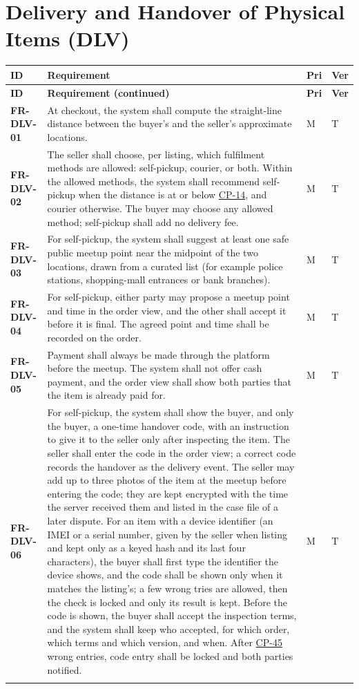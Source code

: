\documentclass[11pt,a4paper]{report}
\makeatletter
\newenvironment{reqs}{%
  \small
  \begin{longtable}{@{}>{\raggedright\arraybackslash}p{2.35cm}
                       >{\raggedright\arraybackslash}p{10.3cm}
                       >{\centering\arraybackslash}p{0.7cm}
                       >{\centering\arraybackslash}p{0.7cm}@{}}
  \toprule
  \textbf{ID} & \textbf{Requirement} & \textbf{Pri} & \textbf{Ver} \\
  \midrule
  \endfirsthead
  \toprule
  \textbf{ID} & \textbf{Requirement (continued)} & \textbf{Pri} & \textbf{Ver} \\
  \midrule
  \endhead
  \bottomrule
  \endfoot
}{\end{longtable}}
\newcommand{\req}[5]{\leavevmode\textbf{#1}\hypertarget{#1}{} & #5 & #2 & #3 \\ \addlinespace[2pt]}
\newcommand{\cp}[1]{\hyperlink{#1}{#1}}
\makeatother
\begin{document}
\section{Delivery and Handover of Physical Items (DLV)}
\label{sec:fr-dlv}
\begin{reqs}
\req{FR-DLV-01}{M}{T}{FR-50}{At checkout, the system shall compute the straight-line distance between the buyer's and the seller's approximate locations.}
\req{FR-DLV-02}{M}{T}{FR-51}{The seller shall choose, per listing, which fulfilment methods are allowed: self-pickup, courier, or both. Within the allowed methods, the system shall recommend self-pickup when the distance is at or below \cp{CP-14}, and courier otherwise. The buyer may choose any allowed method; self-pickup shall add no delivery fee.}
\req{FR-DLV-03}{M}{T}{FR-52}{For self-pickup, the system shall suggest at least one safe public meetup point near the midpoint of the two locations, drawn from a curated list (for example police stations, shopping-mall entrances or bank branches).}
\req{FR-DLV-04}{M}{T}{new}{For self-pickup, either party may propose a meetup point and time in the order view, and the other shall accept it before it is final. The agreed point and time shall be recorded on the order.}
\req{FR-DLV-05}{M}{T}{FR-52}{Payment shall always be made through the platform before the meetup. The system shall not offer cash payment, and the order view shall show both parties that the item is already paid for.}
\req{FR-DLV-06}{M}{T}{new}{For self-pickup, the system shall show the buyer, and only the buyer, a one-time handover code, with an instruction to give it to the seller only after inspecting the item. The seller shall enter the code in the order view; a correct code records the handover as the delivery event. The seller may add up to three photos of the item at the meetup before entering the code; they are kept encrypted with the time the server received them and listed in the case file of a later dispute. For an item with a device identifier (an IMEI or a serial number, given by the seller when listing and kept only as a keyed hash and its last four characters), the buyer shall first type the identifier the device shows, and the code shall be shown only when it matches the listing's; a few wrong tries are allowed, then the check is locked and only its result is kept. Before the code is shown, the buyer shall accept the inspection terms, and the system shall keep who accepted, for which order, which terms and which version, and when. After \cp{CP-45} wrong entries, code entry shall be locked and both parties notified.}

\end{reqs}
\end{document}

